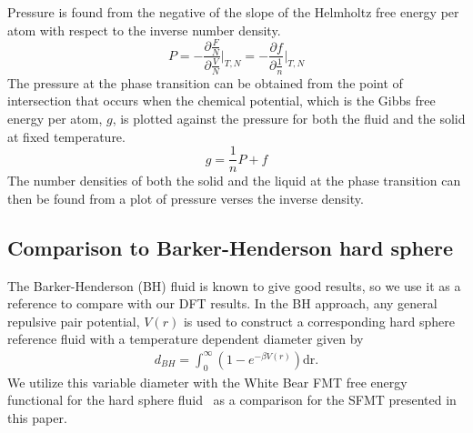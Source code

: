 \documentclass[letterpaper,twocolumn,amsmath,amssymb,prb]{revtex4-1}
\begin{document}
Pressure is found from the negative of the slope of the Helmholtz 
free energy per atom with respect to the inverse number density. 
\begin{equation}{P=-\frac{\partial{\frac{F}{N}}}{\partial{\frac{V}{N}}}\bigg|_{T,N} 
= -\frac{\partial{f}}{\partial{\frac{1}{n}}}\bigg|_{T,N}}\end{equation} 
The pressure at the phase transition can be obtained from the point of intersection
that occurs when the chemical potential, which is the Gibbs free energy per atom, $g$,
is plotted against the pressure for both the fluid and the solid at fixed temperature. 
\begin{equation}{g = \frac{1}{n}P + f}\end{equation}
The number densities of both the solid and the liquid at the phase transition can then
be found from a plot of pressure verses the inverse density. 

\subsection{Comparison to Barker-Henderson hard sphere}

The Barker-Henderson (BH) fluid is known to give good results, so we use it 
as a reference to compare with our DFT results. 
In the BH approach, any general
repulsive pair potential, $V(r)$ is used to construct a corresponding hard
sphere reference fluid with a temperature dependent diameter given by
\begin{align}
  d_{BH} = \int_0^{\infty}\left( 1 - e^{-\beta V(r)} \right)\mathrm{dr}.
  \label{eq:bh-diameter}
\end{align}
We utilize this variable diameter with the White Bear FMT free energy
functional for the hard sphere fluid~\cite{roth2002whitebear} as a
comparison for the SFMT presented in this paper.
\end{document}
